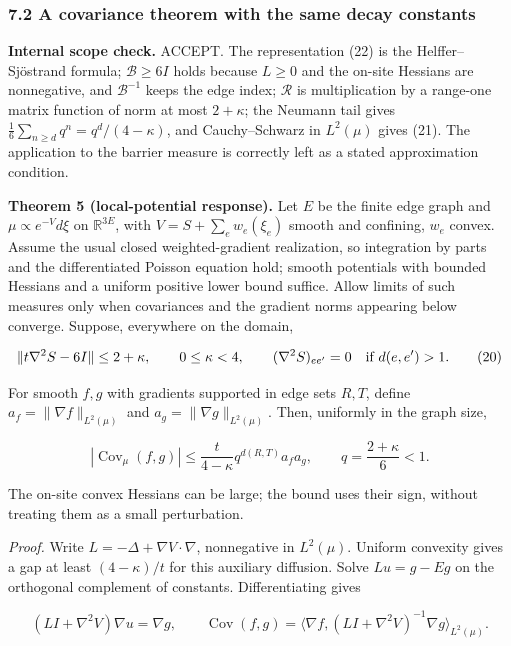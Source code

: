 \documentclass[11pt,a4paper]{article}
\begin{document}
\hypertarget{a-covariance-theorem-with-the-same-decay-constants}{%
\subsubsection{7.2 A covariance theorem with the same decay
constants}\label{a-covariance-theorem-with-the-same-decay-constants}}

\textbf{Internal scope check.} ACCEPT. The representation (22) is the
Helffer--Sjöstrand formula; \(\mathcal B\ge6I\) holds because \(L\ge0\)
and the on-site Hessians are nonnegative, and \(\mathcal B^{-1}\) keeps
the edge index; \(\mathcal R\) is multiplication by a range-one matrix
function of norm at most \(2+\kappa\); the Neumann tail gives
\(\frac16\sum_{n\ge d}q^n=q^d/(4-\kappa)\), and Cauchy--Schwarz in
\(L^2(\mu)\) gives (21). The application to the barrier measure is
correctly left as a stated approximation condition.

\textbf{Theorem 5 (local-potential response).} Let \(E\) be the finite
edge graph and \(\mu\propto e^{-V}d\xi\) on \(\mathbb R^{3E}\), with
\(V=S+\sum_e w_e(\xi_e)\) smooth and confining, \(w_e\) convex. Assume
the usual closed weighted-gradient realization, so integration by parts
and the differentiated Poisson equation hold; smooth potentials with
bounded Hessians and a uniform positive lower bound suffice. Allow
limits of such measures only when covariances and the gradient norms
appearing below converge. Suppose, everywhere on the domain,

\[\|t\nabla^2S-6I\|\le2+\kappa,
\qquad 0\le\kappa<4,\qquad
(\nabla^2S)_{ee'}=0\quad\hbox{if }d(e,e')>1.\tag{20}\]

For smooth \(f,g\) with gradients supported in edge sets \(R,T\), define
\(a_f=\|\nabla f\|_{L^2(\mu)}\) and \(a_g=\|\nabla g\|_{L^2(\mu)}\).
Then, uniformly in the graph size,

\[|\operatorname{Cov}_\mu(f,g)|
\le\frac{t}{4-\kappa}
q^{d(R,T)}a_fa_g,
\qquad q=\frac{2+\kappa}{6}<1.\tag{21}\]

The on-site convex Hessians can be large; the bound uses their sign,
without treating them as a small perturbation.

\emph{Proof.} Write \(L=-\Delta+\nabla V\cdot\nabla\), nonnegative in
\(L^2(\mu)\). Uniform convexity gives a gap at least \((4-\kappa)/t\)
for this auxiliary diffusion. Solve \(Lu=g-Eg\) on the orthogonal
complement of constants. Differentiating gives

\[(LI+\nabla^2V)\nabla u=\nabla g,\qquad
\operatorname{Cov}(f,g)=
\langle\nabla f,(LI+\nabla^2V)^{-1}\nabla g\rangle_{L^2(\mu)}.\tag{22}\]
\end{document}
